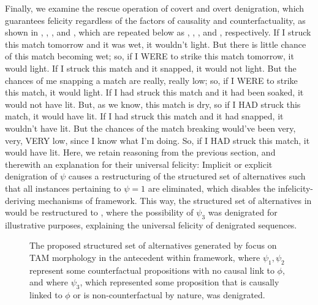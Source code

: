 Finally, we examine the rescue operation of covert and overt denigration, which guarantees felicity regardless of the factors of causality and counterfactuality, as shown in , , , and , which are repeated below as , , , and , respectively.
\pex[nopreamble=true]%
\a{}
    If I struck this match tomorrow and it was wet, it wouldn't light. But there is little chance of this match becoming wet; so, if I \MakeUppercase{were} to strike this match tomorrow, it would light.
\a{}If I struck this match and it snapped, it would not light. But the chances of me snapping a match are really, really low; so, if I \MakeUppercase{were} to strike this match, it would light.
\a{}If I had struck this match and it had been soaked, it would not have lit. But, as we know, this match is dry, so if I \MakeUppercase{had} struck this match, it would have lit.
\a{}If I had struck this match and it had snapped, it wouldn't have lit. But the chances of the match breaking would've been very, very, \MakeUppercase{very} low, since I know what I'm doing. So, if I \MakeUppercase{had} struck this match, it would have lit.
\xe
Here, we retain  reasoning from the previous section, and therewith an explanation for their universal felicity: Implicit or explicit denigration of $\psi$ causes a restructuring of the structured set of alternatives such that all instances pertaining to $\psi=1$ are eliminated, which disables the infelicity-deriving mechanisms of  framework. This way, the structured set of alternatives in  would be restructured to , where the possibility of $\psi_3$ was denigrated for illustrative purposes, explaining the universal felicity of denigrated sequences.
\begin{figure}[!htb]
    \centering
    
    \caption{The proposed structured set of alternatives generated by focus on TAM morphology in the antecedent within  framework, where $\psi_1,\psi_2$ represent some counterfactual propositions with no causal link to $\phi$, and where $\psi_3$, which represented some proposition that is causally linked to $\phi$ or is non-counterfactual by nature, was denigrated.}
\end{figure}

